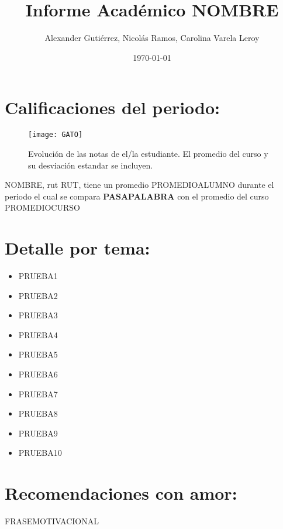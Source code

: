 \documentclass{article}
\title{Informe Acad\'emico NOMBRE}
\author{Alexander Guti\'errez, Nicol\'as Ramos, Carolina Varela Leroy}
\date{\today}
\begin{document}
\maketitle

\section{Calificaciones del periodo:}

\begin{figure}[h!]
\centering
\texttt{[image: GATO]}
\caption{Evoluci\'on de las notas de el/la estudiante. El promedio del curso y su
desviaci\'on estandar se incluyen.}
\label{fig:universe}
\end{figure}

NOMBRE, rut RUT, tiene un promedio PROMEDIOALUMNO durante el periodo el cual se compara {\bf PASAPALABRA } con el promedio del curso PROMEDIOCURSO
\section{Detalle por tema:}
\begin{itemize}
\item PRUEBA1 
\item PRUEBA2
\item PRUEBA3
\item PRUEBA4
\item PRUEBA5
\item PRUEBA6
\item PRUEBA7
\item PRUEBA8
\item PRUEBA9
\item PRUEBA10
\end{itemize}
\section{Recomendaciones con amor:}
FRASEMOTIVACIONAL
\end{document}
